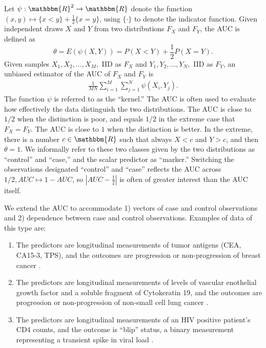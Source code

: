 \documentclass[12pt]{article}
\newcommand{\E}{E}
\renewcommand{\P}{P}
\newcommand{\kernel}{\psi}
\newcommand{\comment}[1]{
  \iftoggle{commenttoggle}{
    {\normalsize{\color{red}{ #1}}\normalsize}
  }
  {}
}
\begin{document}
Let $\kernel:\mathbbm{R}^2\to\mathbbm{R}$ denote the function 
$(x,y)\mapsto\{x<y\}+\frac{1}{2}\{x=y\}$, using $\{\cdot\}$ to denote the indicator function. Given independent draws $X$ and $Y$ from two distributions $F_X$ and $F_Y$, the AUC is defined as
$$\theta=\E(\kernel(X,Y))=\P(X<Y)+\frac{1}{2}\P(X=Y).$$%
Given samples
$X_1,X_2,\ldots,X_M,$ IID as $F_X$ and $Y_1,Y_2,\ldots,Y_N,$ IID as
$F_Y$, an unbiased estimator of the AUC of $F_X$ and $F_Y$ is %
\begin{align}
  \frac{1}{MN}\sum_{i=1}^M\sum_{j=1}^N \psi(X_i,Y_j).
\end{align}
The function
$\kernel$ is referred to as the ``kernel.'' The AUC is often used to
evaluate how effectively the data distinguish the two
distributions. The AUC is close to
$1/2$ when the distinction is poor, and equals
$1/2$ in the extreme case that $F_X=F_Y$. The AUC is close to
$1$ when the distinction is better. In the extreme, there is a number
$c\in\mathbbm{R}$ such that always $X<c$ and
$Y>c$, and then
$\theta=1$. We informally refer to these two classes given by the two
distributions as ``control'' and ``case,'' and the scalar predictor as ``marker.'' %
 Switching the observations designated
``control'' and ``case'' reflects the AUC across $1/2, AUC\mapsto
1-AUC$, so
$|AUC-\frac{1}{2}|$ is often of greater interest than the AUC itself.



We extend the AUC to accommodate 1) vectors of case and control
observations and 2) dependence between case and control
observations. Examples of data of this type are:
\begin{enumerate}
\item The predictors are longitudinal measurements of tumor antigens
  (CEA, CA15-3, TPS), and the outcomes are progression or non-progression
  of breast cancer \citep{emir2000}.
\item The predictors are longitudinal measurements of levels of vascular
enothelial growth factor and a soluble fragment of Cytokeratin
19, and the outcomes are progression or non-progression of non-small cell
lung cancer \citep{wu2011}.
\item The predictors are longitudinal measurements of an HIV positive patient's CD4 counts, and the outcome is ``blip'' status, a binary measurement representing a transient spike in viral load \citep{michael2019}.
\end{enumerate}
\end{document}
